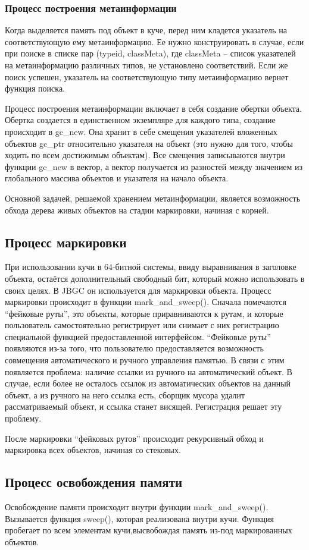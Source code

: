 \subsubsection{Процесс построения метаинформации}
Когда выделяется память под объект в куче, перед ним кладется указатель на соответствующую ему метаинформацию. Ее нужно конструировать в случае, если при поиске в списке пар (typeid, classMeta), где classMeta -- список указателей на метаинформацию различных типов, не установлено соответствий. Если же поиск успешен, указатель на соответствующую типу метаинформацию вернет функция  поиска.

Процесс построения метаинформации включает в себя создание обертки объекта. Обертка создается в единственном экземпляре для каждого типа, создание происходит в gc\_new. Она хранит в себе смещения указателей вложенных объектов gc\_ptr относительно указателя на объект (это нужно для того, чтобы ходить по всем достижимым объектам). Все смещения записываются внутри функции gc\_new в вектор, а вектор получается из разностей между значением из глобального массива объектов и указателя на начало объекта. 

Основной задачей, решаемой хранением метаинформации, является возможность обхода дерева живых объектов на стадии маркировки, начиная с корней.

\subsection{Процесс маркировки}
При использовании кучи в 64-битной системы, ввиду выравнивания в заголовке объекта, остаётся дополнительный свободный бит, который можно использовать в своих целях. В JBGC он используется для маркировки объекта. Процесс маркировки происходит в функции mark\_and\_sweep(). 
Сначала помечаются ``фейковые руты'', это объекты, которые приравниваются к рутам, и которые пользователь самостоятельно регистрирует или снимает с них регистрацию специальной функцией предоставленной интерфейсом.  ``Фейковые руты'' появляются из-за того, что пользователю  предоставляется возможность совмещения автоматического и ручного управления памятью. В связи с этим появляется проблема: наличие ссылки из ручного на автоматический объект. В случае, если более не осталось ссылок из автоматических объектов на данный объект, а из ручного на него ссылка есть, сборщик мусора удалит рассматриваемый объект, и ссылка станет висящей. Регистрация решает эту проблему.

После маркировки ``фейковых рутов'' происходит рекурсивный обход и маркировка всех объектов, начиная со стековых.

\subsection{Процесс освобождения памяти}

Освобождение памяти происходит внутри функции mark\_and\_sweep(). Вызывается функция sweep(), которая реализована внутри кучи. Функция пробегает по всем элементам кучи,высвобождая память из-под маркированных объектов.